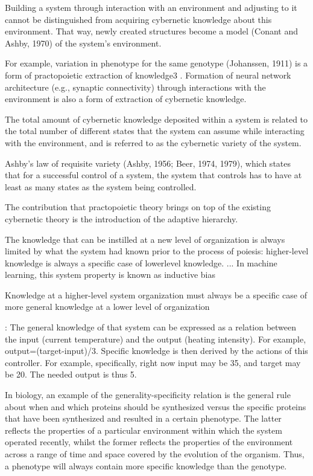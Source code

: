 \documentclass[10pt,a4paper]{article}
\begin{document}
Building a system through
interaction with an environment and adjusting to it cannot be
distinguished from acquiring cybernetic knowledge about this environment.
That way, newly created structures become a model (Conant
and Ashby, 1970) of the system’s environment.


 For example, variation
in phenotype for the same genotype (Johanssen, 1911) is a form of
practopoietic extraction of knowledge3
. Formation of neural network
architecture (e.g., synaptic connectivity) through interactions with the
environment is also a form of extraction of cybernetic knowledge.


The total amount of cybernetic knowledge deposited within a
system is related to the total number of different states that the system
can assume while interacting with the environment, and is referred to
as the cybernetic variety of the system. 

Ashby’s law of requisite variety (Ashby, 1956; Beer, 1974,
1979), which states that for a successful control of a system, the
system that controls has to have at least as many states as the system
being controlled.


The contribution that practopoietic theory brings on top of the
existing cybernetic theory is the introduction of the adaptive
hierarchy. 


The knowledge
that can be instilled at a new level of organization is always
limited by what the system had known prior to the process of
poiesis: higher-level knowledge is always a specific case of lowerlevel
knowledge. ... In machine learning, this system
property is known as inductive bias

Knowledge at a higher-level system
organization must always be a specific case of more general
knowledge at a lower level of organization


: The general
knowledge of that system can be expressed as a relation between the
input (current temperature) and the output (heating intensity). For
example, output=(target-input)/3. Specific knowledge is then derived
by the actions of this controller. For example, specifically, right now
input may be 35, and target may be 20. The needed output is thus 5.


In biology, an example of the generality-specificity relation is the
general rule about when and which proteins should be synthesized
versus the specific proteins that have been synthesized and resulted in a
certain phenotype. The latter reflects the properties of a particular
environment within which the system operated recently, whilst the
former reflects the properties of the environment across a range of time
and space covered by the evolution of the organism. Thus, a phenotype
will always contain more specific knowledge than the genotype.
\end{document}
